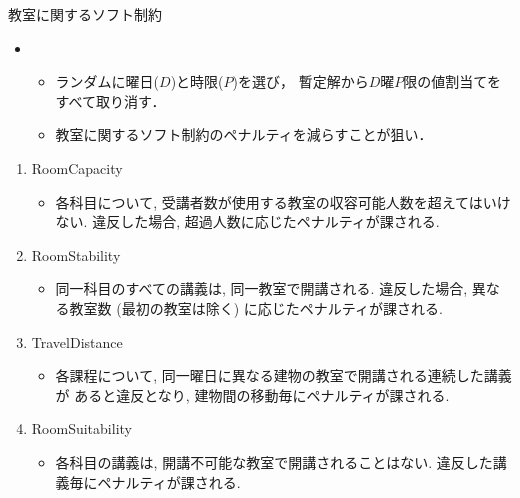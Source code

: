 \documentclass[11pt,dvipdfmx,handout]{beamer}
\begin{document}
\begin{frame}{教室に関するソフト制約}
 \begin{block}{}
 \begin{itemize}
  \item {}
   \begin{itemize}
    \item ランダムに曜日($D$)と時限($P$)を選び，
    暫定解から$D$曜$P$限の値割当てをすべて取り消す．
    \item 教室に関するソフト制約のペナルティを減らすことが狙い．
   \end{itemize}
  \end{itemize}
 \end{block}
 \begin{enumerate}
  \item \alert{RoomCapacity}
   \begin{itemize}
    \item 各科目について, 受講者数が使用する教室の収容可能人数を超えてはいけない. 
    違反した場合, 超過人数に応じたペナルティが課される. 
   \end{itemize}
  \item RoomStability
   \begin{itemize}
    \item 同一科目のすべての講義は, 同一教室で開講される. 
    違反した場合, 異なる教室数 (最初の教室は除く) に応じたペナルティが課される.
   \end{itemize}
  \item \alert{TravelDistance}
   \begin{itemize}
    \item 各課程について, 同一曜日に異なる建物の教室で開講される連続した講義が
    あると違反となり, 建物間の移動毎にペナルティが課される.
   \end{itemize}
  \item RoomSuitability
   \begin{itemize}
    \item 各科目の講義は, 開講不可能な教室で開講されることはない. 
    違反した講義毎にペナルティが課される. 
   \end{itemize}
 \end{enumerate}
\end{frame}
\end{document}

